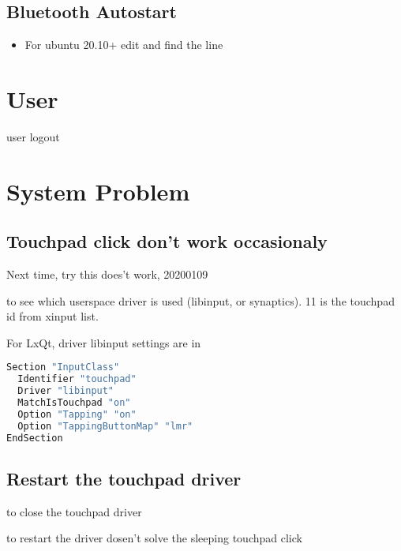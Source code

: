 \subsection{Bluetooth Autostart}
\begin{itemize}
\item For ubuntu 20.10+ edit  and find the line 
\end{itemize}

\section{User}

 user logout



\section{System Problem}

\subsection{Touchpad click don't work occasionaly}
Next time, try this
 {\red does't work, 20200109}

 to see which userspace driver is used (libinput, or synaptics). 11 is the touchpad id from xinput list.

For LxQt, driver libinput settings are in


\begin{lstlisting}[language=Python, caption={/usr/share/X11/xorg.conf.d/40-libinput.conf}]
Section "InputClass"   
  Identifier "touchpad"  
  Driver "libinput"  
  MatchIsTouchpad "on"  
  Option "Tapping" "on"
  Option "TappingButtonMap" "lmr" 
EndSection
\end{lstlisting}


\subsection{Restart the touchpad driver}

 to close the touchpad driver

 to restart the driver {\red dosen't solve the sleeping touchpad click}


